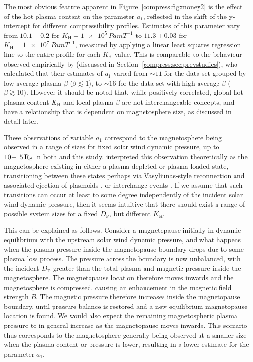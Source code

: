 The most obvious feature apparent in Figure~\ref{compress:fig:money2} is the effect of the hot plasma content on the parameter $a_1$, reflected in the shift of the y-intercept for different compressibility profiles. Estimates of this parameter vary from $10.1 \pm 0.2$ for $K_\mathrm{H}=\SI{1e5}{Pa m T^{-1}}$ to $11.3 \pm 0.03$ for $K_\mathrm{H}=\SI{1e7}{Pa m T^{-1}}$, measured by applying a linear least squares regression line to the entire profile for each $K_\mathrm{H}$ value. This is comparable to the behaviour observed empirically by \citet{pilkington2015} (discussed in Section~\ref{compress:sec:prevstudies}), who calculated that their estimates of $a_1$ varied from ${\sim}11$ for the data set grouped by low average plasma $\beta$ ($\beta\lesssim 1$), to ${\sim}16$ for the data set with high average $\beta$ ($\beta\gtrsim 10$). However it should be noted that, while positively correlated, global hot plasma content $K_\mathrm{H}$ and local plasma $\beta$ are not interchangeable concepts, and have a relationship that is dependent on magnetosphere size, as discussed in detail later. 

These observations of variable $a_1$ correspond to the magnetosphere being observed in a range of sizes for fixed solar wind dynamic pressure, up to $10{\--}\SI{15}{R_S}$ in both \citet{pilkington2015} and this study. \citet{pilkington2015} interpreted this observation theoretically as the magnetosphere existing in either a plasma-depleted or plasma-loaded state, transitioning between these states perhaps via Vasyliunas-style reconnection and associated ejection of plasmoids \citep{vasyliunas1983}, or interchange events \citep{mitchell2015}. If we assume that such transitions can occur at least to some degree independently of the incident solar wind dynamic pressure, then it seems intuitive that there should exist a range of possible system sizes for a fixed $D_\mathrm{P}$, but different $K_\mathrm{H}$. 

This can be explained as follows. Consider a magnetopause initially in dynamic equilibrium with the upstream solar wind dynamic pressure, and what happens when the plasma pressure inside the magnetopause boundary drops due to some plasma loss process. The pressure across the boundary is now unbalanced, with the incident $D_\mathrm{P}$ greater than the total plasma and magnetic pressure inside the magnetosphere. The magnetopause location therefore moves inwards and the magnetosphere is compressed, causing an enhancement in the magnetic field strength $B$. The magnetic pressure therefore increases inside the magnetopause boundary, until pressure balance is restored and a new equilibrium magnetopause location is found. We would also expect the remaining magnetospheric plasma pressure to in general increase as the magnetopause moves inwards. This scenario thus corresponds to the magnetosphere generally being observed at a smaller size when the plasma content or pressure is lower, resulting in a lower estimate for the parameter $a_1$.

